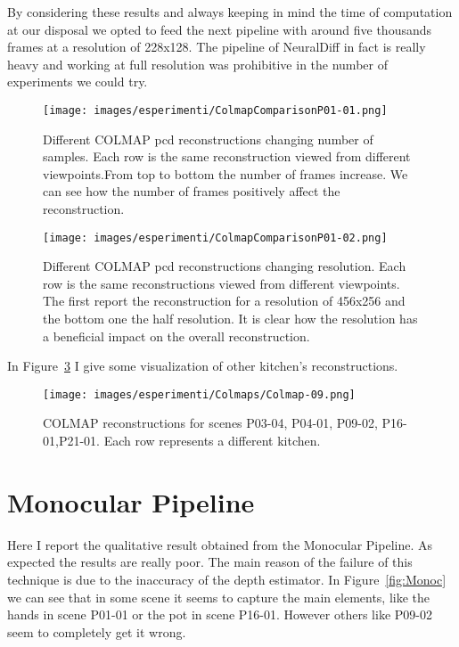 By considering these results and always keeping in mind the time of computation at our disposal
we opted to feed the next pipeline with around five thousands frames at a resolution 
of 228x128. The pipeline of NeuralDiff in fact is really heavy and working at full resolution
was prohibitive in the number of experiments we could try.


\begin{figure}[H]
    \centering
    \texttt{[image: images/esperimenti/ColmapComparisonP01-01.png]} 
    \caption{Different COLMAP pcd reconstructions changing number of samples. 
    Each row is the same reconstruction viewed from different viewpoints.From top to bottom the number of frames increase. We can see
    how the number of frames positively affect the reconstruction.}\label{fig:colmap_P01_frames}
\end{figure}
\begin{figure}[H]
    \centering
    \texttt{[image: images/esperimenti/ColmapComparisonP01-02.png]} 
    \caption{Different COLMAP pcd reconstructions changing
    resolution. Each row is the same reconstructions viewed from different viewpoints. The first report 
    the reconstruction for a resolution of 456x256 and the bottom one the half resolution. It is clear 
    how the resolution has a beneficial impact on the overall reconstruction.}\label{fig:colmap_P01_res}
\end{figure}
In Figure~\ref{fig:COL_all} I give some visualization of other kitchen's reconstructions.
\begin{figure}[H]
    \centering
    \texttt{[image: images/esperimenti/Colmaps/Colmap-09.png]} 
    \caption{COLMAP reconstructions for scenes P03-04, P04-01, P09-02, P16-01,P21-01. Each row represents a different kitchen.}\label{fig:COL_all}
\end{figure}
\section{Monocular Pipeline}
Here I report the qualitative result obtained from the Monocular Pipeline. As expected the results are really poor.
The main reason of the failure of this technique is due to the inaccuracy of the depth estimator. In Figure~\ref{fig:Monoc} we can see
that in some scene it seems to capture the main elements, like the hands in scene  P01-01 or the pot in scene P16-01. However others like P09-02 seem
to completely get it wrong.

